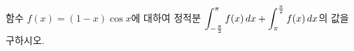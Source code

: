 함수 $f(x)=(1-x)\cos x$에 대하여 정적분 $\displaystyle\int_{-\frac{\pi}{2}}^{\pi}f(x)\mkern3mu dx+\int_{\pi}^{\frac{\pi}{2}}f(x)\mkern3mu dx$의 값을 구하시오.
